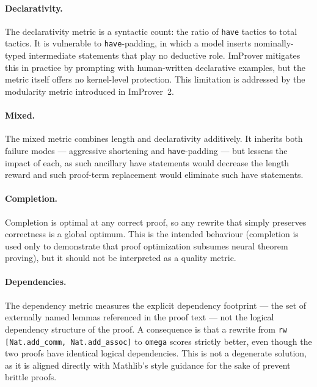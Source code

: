\paragraph{Declarativity.} The declarativity metric is a syntactic count: the ratio of \texttt{have} tactics to total tactics. It is vulnerable to \texttt{have}-padding, in which a model inserts nominally-typed intermediate statements that play no deductive role. ImProver mitigates this in practice by prompting with human-written declarative examples, but the metric itself offers no kernel-level protection. This limitation is addressed by the modularity metric introduced in ImProver~2.

\paragraph{Mixed.} The mixed metric combines length and declarativity additively. It inherits both failure modes --- aggressive shortening and \texttt{have}-padding --- but lessens the impact of each, as such ancillary have statements would decrease the length reward and such proof-term replacement would eliminate such have statements.

\paragraph{Completion.} Completion is optimal at any correct proof, so any rewrite that simply preserves correctness is a global optimum. This is the intended behaviour (completion is used only to demonstrate that proof optimization subsumes neural theorem proving), but it should not be interpreted as a quality metric.

\paragraph{Dependencies.} The dependency metric measures the explicit dependency footprint --- the set of externally named lemmas referenced in the proof text --- not the logical dependency structure of the proof. A consequence is that a rewrite from \texttt{rw [Nat.add\_comm, Nat.add\_assoc]} to \texttt{omega} scores strictly better, even though the two proofs have identical logical dependencies. This is not a degenerate solution, as it is aligned directly with Mathlib's style guidance \cite{lean_style_guide} for the sake of prevent brittle proofs.

